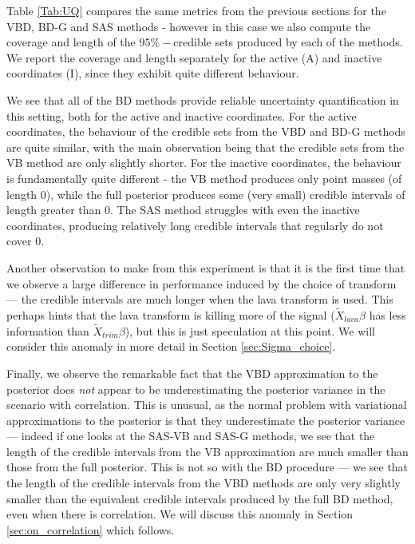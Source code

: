 \documentclass[11pt]{article}
\numberwithin{equation}{section}
\begin{document}
Table \ref{Tab:UQ} compares the same metrics from the previous sections for the VBD, BD-G and SAS methods - however in this case we also compute the coverage and length of the $95\%-$credible sets produced by each of the methods. We report the coverage and length separately for the active (A) and inactive coordinates (I), since they exhibit quite different behaviour. 

We see that all of the BD methods provide reliable uncertainty quantification in this setting, both for the active and inactive coordinates. For the active coordinates, the behaviour of the credible sets from the VBD and BD-G methods are quite similar, with the main observation being that the credible sets from the VB method are only slightly shorter. For the inactive coordinates, the behaviour is fundamentally quite different - the VB method produces only point masses (of length 0), while the full posterior produces some (very small) credible intervals of length greater than 0. The SAS method struggles with even the inactive coordinates, producing relatively long credible intervals that regularly do not cover 0.

Another observation to make from this experiment is that it is the first time that we observe a large difference in performance induced by the choice of transform --- the credible intervals are much longer when the lava transform is used. This perhaps hints that the lava transform is killing more of the signal ($\tilde{X}_{lava} \beta$ has less information than $\tilde{X}_{trim} \beta$), but this is just speculation at this point. We will consider this anomaly in more detail in Section \ref{sec:Sigma_choice}.

Finally, we observe the remarkable fact that the VBD approximation to the posterior does {\it not} appear to be underestimating the posterior variance in the scenario with correlation. This is unusual, as the normal problem with variational approximations to the posterior is that they underestimate the posterior variance --- indeed if one looks at the SAS-VB and SAS-G methods, we see that the length of the credible intervals from the VB approximation are much smaller than those from the full posterior. This is not so with the BD procedure --- we see that the length of the credible intervals from the VBD methods are only very slightly smaller than the equivalent credible intervals produced by the full BD method, even when there is correlation. We will discuss this anomaly in Section \ref{sec:on_correlation} which follows.
\end{document}
